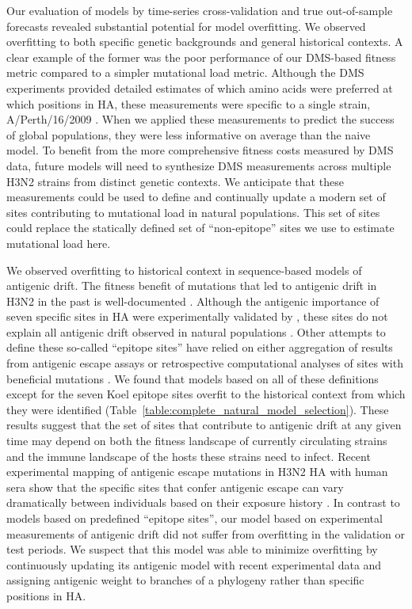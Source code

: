Our evaluation of models by time-series cross-validation and true out-of-sample forecasts revealed substantial potential for model overfitting.
We observed overfitting to both specific genetic backgrounds and general historical contexts.
A clear example of the former was the poor performance of our DMS-based fitness metric compared to a simpler mutational load metric.
Although the DMS experiments provided detailed estimates of which amino acids were preferred at which positions in HA, these measurements were specific to a single strain, A/Perth/16/2009 \citep{Lee2018}.
When we applied these measurements to predict the success of global populations, they were less informative on average than the naive model.
To benefit from the more comprehensive fitness costs measured by DMS data, future models will need to synthesize DMS measurements across multiple H3N2 strains from distinct genetic contexts.
We anticipate that these measurements could be used to define and continually update a modern set of sites contributing to mutational load in natural populations.
This set of sites could replace the statically defined set of ``non-epitope'' sites we use to estimate mutational load here.

We observed overfitting to historical context in sequence-based models of antigenic drift.
The fitness benefit of mutations that led to antigenic drift in H3N2 in the past is well-documented \citep{Wiley:1981bc,Smith:2004jc,Wolf:2006da,Koel:2013jz}.
Although the antigenic importance of seven specific sites in HA were experimentally validated by \cite{Koel:2013jz}, these sites do not explain all antigenic drift observed in natural populations \citep{Neher:2016hy}.
Other attempts to define these so-called ``epitope sites'' have relied on either aggregation of results from antigenic escape assays \citep{Wolf:2006da} or retrospective computational analyses of sites with beneficial mutations \citep{Shih:2007bd,Luksza:2014hj}.
We found that models based on all of these definitions except for the seven Koel epitope sites overfit to the historical context from which they were identified (Table~\ref{table:complete_natural_model_selection}).
These results suggest that the set of sites that contribute to antigenic drift at any given time may depend on both the fitness landscape of currently circulating strains and the immune landscape of the hosts these strains need to infect.
Recent experimental mapping of antigenic escape mutations in H3N2 HA with human sera show that the specific sites that confer antigenic escape can vary dramatically between individuals based on their exposure history \citep{Lee2019}.
In contrast to models based on predefined ``epitope sites'', our model based on experimental measurements of antigenic drift did not suffer from overfitting in the validation or test periods.
We suspect that this model was able to minimize overfitting by continuously updating its antigenic model with recent experimental data and assigning antigenic weight to branches of a phylogeny rather than specific positions in HA.

